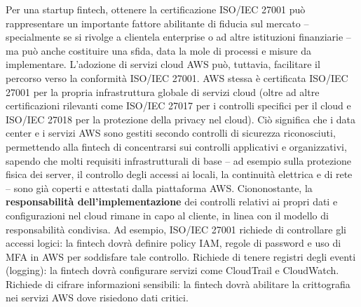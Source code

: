 Per una startup fintech, ottenere la certificazione ISO/IEC 27001 può rappresentare un importante fattore abilitante di fiducia sul mercato – specialmente se si rivolge a clientela enterprise o ad altre istituzioni finanziarie – ma può anche costituire una sfida, data la mole di processi e misure da implementare. L'adozione di servizi cloud AWS può, tuttavia, facilitare il percorso verso la conformità ISO/IEC 27001. AWS stessa è certificata ISO/IEC 27001 per la propria infrastruttura globale di servizi cloud (oltre ad altre certificazioni rilevanti come ISO/IEC 27017 per i controlli specifici per il cloud e ISO/IEC 27018 per la protezione della privacy nel cloud). Ciò significa che i data center e i servizi AWS sono gestiti secondo controlli di sicurezza riconosciuti, permettendo alla fintech di concentrarsi sui controlli applicativi e organizzativi, sapendo che molti requisiti infrastrutturali di base – ad esempio sulla protezione fisica dei server, il controllo degli accessi ai locali, la continuità elettrica e di rete – sono già coperti e attestati dalla piattaforma AWS. Ciononostante, la \textbf{responsabilità dell'implementazione} dei controlli relativi ai propri dati e configurazioni nel cloud rimane in capo al cliente, in linea con il modello di responsabilità condivisa. Ad esempio, ISO/IEC 27001 richiede di controllare gli accessi logici: la fintech dovrà definire policy IAM, regole di password e uso di MFA in AWS per soddisfare tale controllo. Richiede di tenere registri degli eventi (logging): la fintech dovrà configurare servizi come CloudTrail e CloudWatch. Richiede di cifrare informazioni sensibili: la fintech dovrà abilitare la crittografia nei servizi AWS dove risiedono dati critici.

